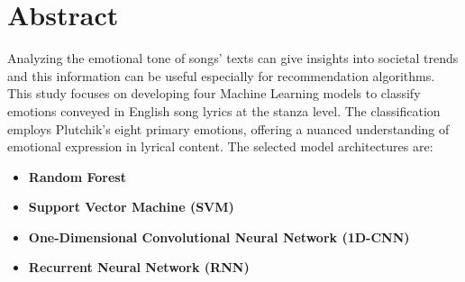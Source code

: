 \chapter*{Abstract}


Analyzing the emotional tone of songs' texts can give insights into societal trends and this information can be useful especially for recommendation
algorithms. This study focuses on developing four Machine Learning models to classify
emotions conveyed in English song lyrics at the stanza level. The
classification employs Plutchik's eight primary emotions,
offering a nuanced understanding of emotional expression in lyrical content.
The selected model architectures are:
\begin{itemize}
    \item \textbf{Random Forest}
    \item \textbf{Support Vector Machine (SVM)}
    \item \textbf{One-Dimensional Convolutional Neural Network (1D-CNN)}
    \item \textbf{Recurrent Neural Network (RNN)}
\end{itemize}
